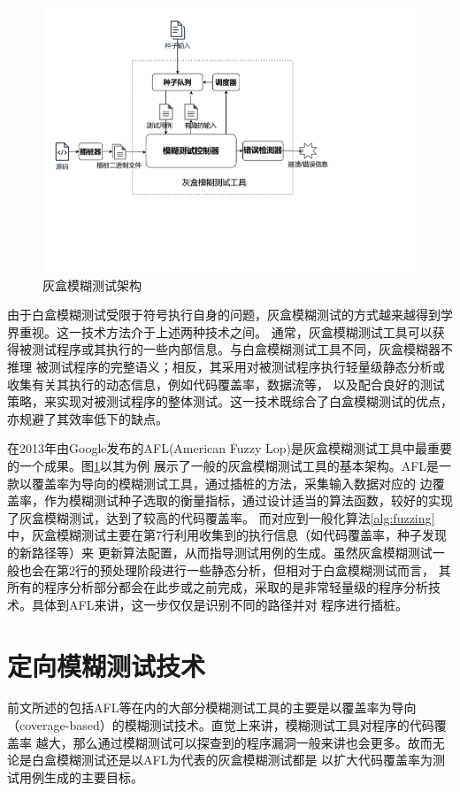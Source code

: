 \documentclass[bachelor]{njupthesis}
\begin{document}
\begin{figure}[htbp]
	\centering
	\includegraphics[width=1\textwidth]{pic/GF.pdf}
	\caption{灰盒模糊测试架构}
 	\label{GF}
\end{figure}

由于白盒模糊测试受限于符号执行自身的问题，灰盒模糊测试的方式越来越得到学界重视。这一技术方法介于上述两种技术之间。
通常，灰盒模糊测试工具可以获得被测试程序或其执行的一些内部信息。与白盒模糊测试工具不同，灰盒模糊器不推理
被测试程序的完整语义；相反，其采用对被测试程序执行轻量级静态分析或收集有关其执行的动态信息，例如代码覆盖率，数据流等，
以及配合良好的测试策略，来实现对被测试程序的整体测试。这一技术既综合了白盒模糊测试的优点，亦规避了其效率低下的缺点。

在2013年由Google发布的AFL\cite{AFL}(American Fuzzy Lop)是灰盒模糊测试工具中最重要的一个成果。图\ref{GF}以其为例
展示了一般的灰盒模糊测试工具的基本架构。AFL是一款以覆盖率为导向的模糊测试工具，通过插桩的方法，采集输入数据对应的
边覆盖率，作为模糊测试种子选取的衡量指标，通过设计适当的算法函数，较好的实现了灰盒模糊测试，达到了较高的代码覆盖率。
而对应到一般化算法\ref{alg:fuzzing}中，灰盒模糊测试主要在第7行利用收集到的执行信息（如代码覆盖率，种子发现的新路径等）来
更新算法配置，从而指导测试用例的生成。虽然灰盒模糊测试一般也会在第2行的预处理阶段进行一些静态分析，但相对于白盒模糊测试而言，
其所有的程序分析部分都会在此步或之前完成，采取的是非常轻量级的程序分析技术。具体到AFL来讲，这一步仅仅是识别不同的路径并对
程序进行插桩。

\section{定向模糊测试技术}
前文所述的包括AFL等在内的大部分模糊测试工具的主要是以覆盖率为导向（coverage-based）的模糊测试技术。直觉上来讲，模糊测试工具对程序的代码覆盖率
越大，那么通过模糊测试可以探查到的程序漏洞一般来讲也会更多。故而无论是白盒模糊测试还是以AFL为代表的灰盒模糊测试都是
以扩大代码覆盖率为测试用例生成的主要目标。
\end{document}
